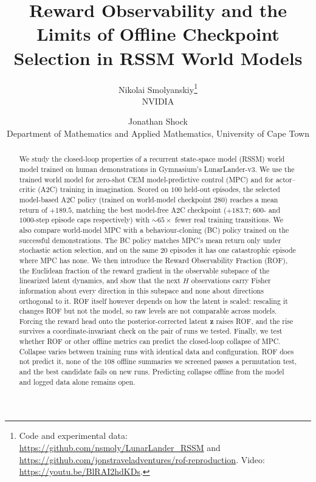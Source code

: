 \documentclass[11pt]{article}
\title{Reward Observability and the Limits of Offline Checkpoint Selection in RSSM World Models}
\author{Nikolai Smolyanskiy\thanks{Code and experimental data:
\url{https://github.com/nsmoly/LunarLander_RSSM} and \newline
\hspace*{1.5em}\url{https://github.com/jonstraveladventures/rof-reproduction}. \newline
\hspace*{1.5em}Video: \url{https://youtu.be/BlRAI2hdKDs}.}\\
\small NVIDIA
\and
Jonathan Shock\\
\small Department of Mathematics and Applied Mathematics, University of Cape Town}
\date{}
\theoremstyle{remark}
\begin{document}
\maketitle
\begingroup
\renewcommand{\thefootnote}{}
\endgroup

\begin{abstract}
We study the closed-loop properties of a recurrent state-space model (RSSM) world model trained on human demonstrations in Gymnasium's LunarLander-v3. We use the trained world model for zero-shot CEM model-predictive control (MPC) and for actor--critic (A2C) training in imagination. Scored on $100$ held-out episodes, the selected model-based A2C policy (trained on world-model checkpoint $280$) reaches a mean return of $+189.5$, matching the best model-free A2C checkpoint ($+183.7$; $600$- and $1000$-step episode caps respectively) with ${\sim}65\times$ fewer real training transitions. We also compare world-model MPC with a behaviour-cloning (BC) policy trained on the successful demonstrations. The BC policy matches MPC's mean return only under stochastic action selection, and on the same $20$ episodes it has one catastrophic episode where MPC has none. We then introduce the Reward Observability Fraction (ROF), the Euclidean fraction of the reward gradient in the observable subspace of the linearized latent dynamics, and show that the next $H$ observations carry Fisher information about every direction in this subspace and none about directions orthogonal to it. ROF itself however depends on how the latent is scaled: rescaling it changes ROF but not the model, so raw levels are not comparable across models. Forcing the reward head onto the posterior-corrected latent $\bm{z}$ raises ROF, and the rise survives a coordinate-invariant check on the pair of runs we tested. Finally, we test whether ROF or other offline metrics can predict the closed-loop collapse of MPC. Collapse varies between training runs with identical data and configuration. ROF does not predict it, none of the $108$ offline summaries we screened passes a permutation test, and the best candidate fails on new runs. Predicting collapse offline from the model and logged data alone remains open.
\end{abstract}
\end{document}
